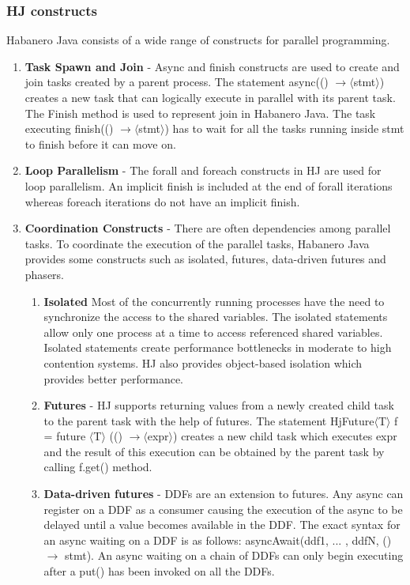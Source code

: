\subsubsection{HJ constructs}
Habanero Java consists of a wide range of constructs for parallel programming.
\begin{enumerate}
\item \textbf{Task Spawn and Join} - Async and finish constructs are used to create and join tasks created by a parent process. The statement async(() $ \rightarrow \langle$stmt$\rangle$) creates a new task that can logically execute in parallel with its parent task. The Finish method is used to represent join in Habanero Java. The task executing finish(() $ \rightarrow \langle$stmt$\rangle$) has to wait for all the tasks running inside stmt to finish before it can move on.
\item \textbf{Loop Parallelism} - The forall and foreach constructs in HJ are used for loop parallelism. An implicit finish is included at the end of forall iterations whereas foreach iterations do not have an implicit finish. 
\item \textbf{Coordination Constructs} - There are often dependencies among parallel tasks. To coordinate the execution of the parallel tasks, Habanero Java provides some constructs such as isolated, futures, data-driven futures and phasers.
\begin{enumerate}
\item \textbf{Isolated}
Most of the concurrently running processes have the need to synchronize the access to the shared variables. The isolated statements allow only one process at a time to access referenced shared variables. Isolated statements create performance bottlenecks in moderate to high contention systems. HJ also provides object-based isolation which provides better performance.
\item \textbf{Futures} - HJ supports returning values from a newly created child task to the parent task with the help of futures. The statement HjFuture$\langle$T$\rangle$ f = future $\langle$T$\rangle$ (() $ \rightarrow \langle$expr$\rangle$) creates a new child task which executes expr and the result of this execution can be obtained by the parent task by calling f.get() method.
\item \textbf{Data-driven futures} - DDFs are an extension to futures. Any async can register on a DDF as a consumer causing the execution of the async to be delayed until a value becomes available in the DDF. The exact syntax for an async waiting on a DDF is as follows: asyncAwait(ddf1, ... , ddfN, () $\rightarrow$ stmt). An async waiting on a chain of DDFs can only begin executing after a put() has been invoked on all the DDFs.

\end{enumerate}
\end{enumerate}

